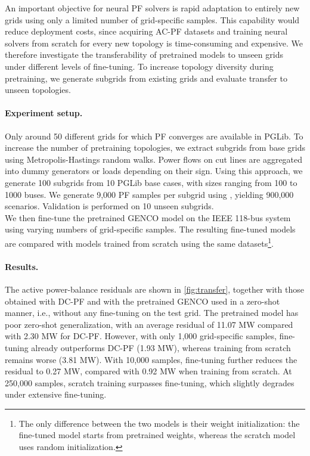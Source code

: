An important objective for neural PF solvers is rapid adaptation to entirely new grids using only a limited number of grid-specific samples. This capability would reduce deployment costs, since acquiring AC-PF datasets and training neural solvers from scratch for every new topology is time-consuming and expensive. We therefore investigate the transferability of pretrained \genco models to unseen grids under different levels of fine-tuning. To increase topology diversity during pretraining, we generate subgrids from existing grids and evaluate transfer to unseen topologies.

\paragraph{Experiment setup.}
Only around 50 different grids for which PF converges are available in PGLib. To increase the number of pretraining topologies, we extract subgrids from base grids using Metropolis-Hastings random walks. Power flows on cut lines are aggregated into dummy generators or loads depending on their sign. Using this approach, we generate 100 subgrids from 10 PGLib base cases, with sizes ranging from 100 to 1000 buses. We generate 9,000 PF samples per subgrid using \datakit, yielding 900,000 scenarios. Validation is performed on 10 unseen subgrids. \\ 

We then fine-tune the pretrained GENCO model on the IEEE 118-bus system using varying numbers of grid-specific samples. The resulting fine-tuned models are compared with models trained from scratch using the same datasets\footnote{The only difference between the two models is their weight initialization: the fine-tuned model starts from pretrained weights, whereas the scratch model uses random initialization.}.

\paragraph{Results.}
The active power-balance residuals are shown in \cref{fig:transfer}, together with those obtained with DC-PF and with the pretrained GENCO used in a zero-shot manner, i.e., without any fine-tuning on the test grid. The pretrained model has poor zero-shot generalization, with an average residual of 11.07 MW compared with 2.30 MW for DC-PF. However, with only 1,000 grid-specific samples, fine-tuning already outperforms DC-PF (1.93 MW), whereas training from scratch remains worse (3.81 MW). With 10,000 samples, fine-tuning further reduces the residual to 0.27 MW, compared with 0.92 MW when training from scratch. At 250,000 samples, scratch training surpasses fine-tuning, which slightly degrades under extensive fine-tuning.\\

